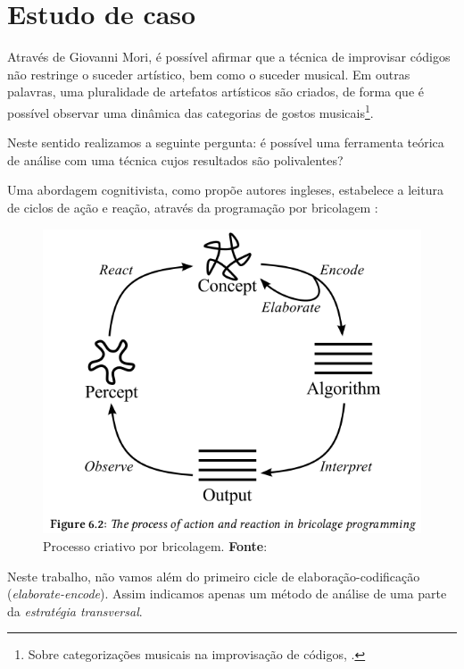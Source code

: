 \chapter{Estudo de caso}\label{cap:estudos_de_caso}

Através de Giovanni Mori, é possível afirmar que a técnica de improvisar códigos não restringe o suceder artístico, bem como o suceder musical. Em outras palavras, uma pluralidade de artefatos artísticos \cite{prospero_social_2015} são criados, de forma que é possível observar uma dinâmica das categorias de gostos musicais\footnote{Sobre categorizações musicais na improvisação de códigos, .}. 

Neste sentido realizamos a seguinte pergunta: é possível uma ferramenta teórica de análise com uma técnica cujos resultados são polivalentes?

Uma abordagem cognitivista, como propõe autores ingleses, estabelece a leitura de ciclos de ação e reação, através da programação por bricolagem :

\begin{figure}[!h]
  \centering
  \includegraphics[scale=0.5]{./imagens/processo_criativo.png}
  \caption{Processo criativo por bricolagem. \textbf{Fonte}: \cite[p.~122]{McLean2011}}
  \label{fig:bricolagem}
\end{figure}
  

Neste trabalho, não vamos além do primeiro cicle de elaboração-codificação (\emph{elaborate-encode}). Assim indicamos apenas um método de análise de uma parte da  \emph{estratégia transversal}. 


